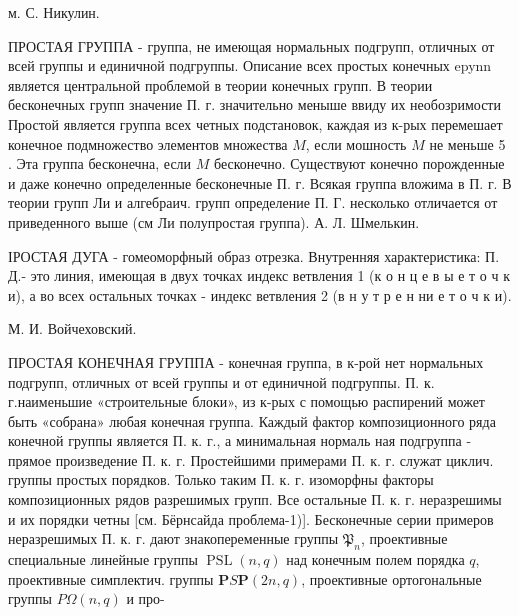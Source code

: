 \documentclass[10pt]{article}
\begin{document}
м. С. Никулин.



ПРОСТАЯ ГРУППА - группа, не имеющая нормальных подгрупп, отличных от всей группы и единичной подгруппы. Описание всех простых конечных epynn является центральной проблемой в теории конечных групп. В теории бесконечных групп значение П. г. значительно меныше ввиду их необозримости Простой является группа всех четных подстановок, каждая из к-рых перемешает конечное подмножество элементов множества $M$, если мошность $M$ не меньше 5 . Эта группа бесконечна, если $M$ бесконечно. Существуют конечно порожденные и даже конечно определенные бесконечные П. г. Всякая группа вложима в П. г. В теории групп Ли и алгебраич. групп определение П. Г. несколько отличается от приведенного выше (см Ли полупростая группа). А. Л. Шмелькин.



ІРОСТАЯ ДУГА - гомеоморфный образ отрезка. Внутренняя характеристика: П. Д.- это линия, имеющая в двух точках индекс ветвления 1 (к о н ц е в ы е т о ч к и), а во всех остальных точках - индекс ветвления 2 (в н у т р е н ни е т о ч к и).



М. И. Войчеховский.



ПРОСТАЯ КОНЕЧНАЯ ГРУППА - конечная группа, в к-рой нет нормальных подгрупп, отличных от всей группы и от единичной подгруппы. П. к. г.наименьшие «строительные блоки», из к-рых с помощью распирений может быть «собрана» любая конечная группа. Каждый фактор композиционного ряда конечной группы является П. к. г., а минимальная нормаль ная подгруппа - прямое произведение П. к. г. Простейшими примерами П. к. г. служат циклич. группы простых порядков. Только таким П. к. г. изоморфны факторы композиционных рядов разрешимых групп. Все остальные П. к. г. неразрешимы и их порядки четны [см. Бёрнсайда проблема-1)]. Бесконечные серии примеров неразрешимых П. к. г. дают знакопеременные группы $\mathfrak{P}_{n}$, проективные специальные линейные группы $\operatorname{PSL}(n, q)$ над конечным полем порядка $q$, проективные симплектич. группы $\boldsymbol{P} S \boldsymbol{P}(2 n, q)$, проективные ортогональные группы $P \Omega(n, q)$ и про-
\end{document}
